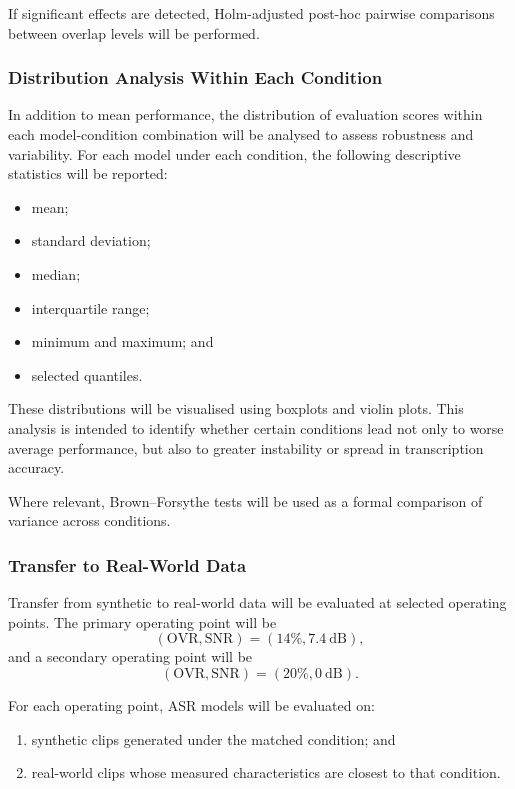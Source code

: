 If significant effects are detected, Holm-adjusted post-hoc pairwise comparisons between overlap levels will be performed.

\subsubsection{Distribution Analysis Within Each Condition}

In addition to mean performance, the distribution of evaluation scores within each model-condition combination will be analysed to assess robustness and variability. For each model under each condition, the following descriptive statistics will be reported:
\begin{itemize}
    \item mean;
    \item standard deviation;
    \item median;
    \item interquartile range;
    \item minimum and maximum; and
    \item selected quantiles.
\end{itemize}

These distributions will be visualised using boxplots and violin plots. This analysis is intended to identify whether certain conditions lead not only to worse average performance, but also to greater instability or spread in transcription accuracy.

Where relevant, Brown--Forsythe tests will be used as a formal comparison of variance across conditions.

\subsubsection{Transfer to Real-World Data}

Transfer from synthetic to real-world data will be evaluated at selected operating points. The primary operating point will be
\begin{equation}
(\mathrm{OVR}, \mathrm{SNR}) = (14\%, 7.4\ \mathrm{dB}),
\end{equation}
and a secondary operating point will be
\begin{equation}
(\mathrm{OVR}, \mathrm{SNR}) = (20\%, 0\ \mathrm{dB}).
\end{equation}

For each operating point, ASR models will be evaluated on:
\begin{enumerate}
    \item synthetic clips generated under the matched condition; and
    \item real-world clips whose measured characteristics are closest to that condition.
\end{enumerate}

